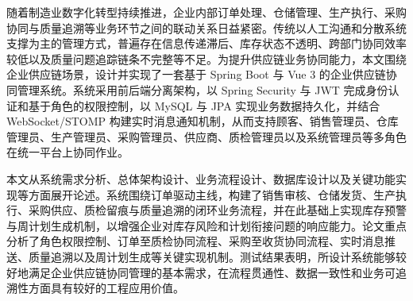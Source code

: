 \cnabstract

随着制造业数字化转型持续推进，企业内部订单处理、仓储管理、生产执行、采购协同与质量追溯等业务环节之间的联动关系日益紧密。传统以人工沟通和分散系统支撑为主的管理方式，普遍存在信息传递滞后、库存状态不透明、跨部门协同效率较低以及质量问题追踪链条不完整等不足。为提升供应链业务协同能力，本文围绕企业供应链场景，设计并实现了一套基于 Spring Boot 与 Vue 3 的企业供应链协同管理系统。系统采用前后端分离架构，以 Spring Security 与 JWT 完成身份认证和基于角色的权限控制，以 MySQL 与 JPA 实现业务数据持久化，并结合 WebSocket/STOMP 构建实时消息通知机制，从而支持顾客、销售管理员、仓库管理员、生产管理员、采购管理员、供应商、质检管理员以及系统管理员等多角色在统一平台上协同作业。

本文从系统需求分析、总体架构设计、业务流程设计、数据库设计以及关键功能实现等方面展开论述。系统围绕订单驱动主线，构建了销售审核、仓储发货、生产执行、采购供应、质检留痕与质量追溯的闭环业务流程，并在此基础上实现库存预警与周计划生成机制，以增强企业对库存风险和计划衔接问题的响应能力。论文重点分析了角色权限控制、订单至质检协同流程、采购至收货协同流程、实时消息推送、质量追溯以及周计划生成等关键实现机制。测试结果表明，所设计系统能够较好地满足企业供应链协同管理的基本需求，在流程贯通性、数据一致性和业务可追溯性方面具有较好的工程应用价值。

